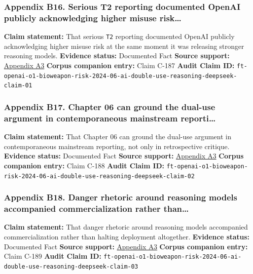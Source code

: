 \documentclass[
  american,
  11pt,
  letterpaper,
]{article}
\begin{document}
\subsubsection{Appendix B16. Serious T2 reporting documented OpenAI
publicly acknowledging higher misuse
risk\ldots{}}\label{appendix-b16-serious-t2-reporting-documented-openai-publicly-acknowledging-higher-misuse-risk}

\textbf{Claim statement:} That serious \texttt{T2} reporting documented
OpenAI publicly acknowledging higher misuse risk at the same moment it
was releasing stronger reasoning models. \textbf{Evidence status:}
Documented Fact \textbf{Source support:}
\hyperref[appendix-a3-openai-acknowledges-new-models-increase-risk-of-misuse-to-create-bioweapons]{Appendix
A3} \textbf{Corpus companion entry:} Claim C-187 \textbf{Audit Claim
ID:}
\texttt{ft-openai-o1-bioweapon-risk-2024-06-ai-double-use-reasoning-deepseek-claim-01}

\subsubsection{Appendix B17. Chapter 06 can ground the dual-use argument
in contemporaneous mainstream
reporti\ldots{}}\label{appendix-b17-chapter-06-can-ground-the-dual-use-argument-in-contemporaneous-mainstream-reporti}

\textbf{Claim statement:} That Chapter 06 can ground the dual-use
argument in contemporaneous mainstream reporting, not only in
retrospective critique. \textbf{Evidence status:} Documented Fact
\textbf{Source support:}
\hyperref[appendix-a3-openai-acknowledges-new-models-increase-risk-of-misuse-to-create-bioweapons]{Appendix
A3} \textbf{Corpus companion entry:} Claim C-188 \textbf{Audit Claim
ID:}
\texttt{ft-openai-o1-bioweapon-risk-2024-06-ai-double-use-reasoning-deepseek-claim-02}

\subsubsection{Appendix B18. Danger rhetoric around reasoning models
accompanied commercialization rather
than\ldots{}}\label{appendix-b18-danger-rhetoric-around-reasoning-models-accompanied-commercialization-rather-than}

\textbf{Claim statement:} That danger rhetoric around reasoning models
accompanied commercialization rather than halting deployment altogether.
\textbf{Evidence status:} Documented Fact \textbf{Source support:}
\hyperref[appendix-a3-openai-acknowledges-new-models-increase-risk-of-misuse-to-create-bioweapons]{Appendix
A3} \textbf{Corpus companion entry:} Claim C-189 \textbf{Audit Claim
ID:}
\texttt{ft-openai-o1-bioweapon-risk-2024-06-ai-double-use-reasoning-deepseek-claim-03}
\end{document}
